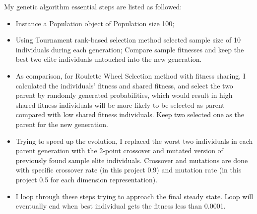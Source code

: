 \documentclass[10pt,b5paper]{article}
\begin{document}
My genetic algorithm essential steps are listed as followed:
\begin{itemize}
\item Instance a Population object of Population size 100;
\item Using Tournament rank-based selection method selected sample size of 10 individuals during each generation; Compare sample fitnesses and keep the best two elite individuals untouched into the new generation.
\item As comparison, for Roulette Wheel Selection method with fitness sharing, I calculated the individuals' fitness and shared fitness, and select the two parent by randomly generated probabilities, which would result in high shared fitness individuals will be more likely to be selected as parent compared with low shared fitness individuals. Keep two selected one as the parent for the new generation.
\item Trying to speed up the evolution, I replaced the worst two individuals in each parent generation with the 2-point crossover and mutated version of previously found sample elite individuals. Crossover and mutations are done with specific crossover rate (in this project 0.9) and mutation rate (in this project 0.5 for each dimension representation).
\item I loop through these steps trying to approach the final steady state. Loop will eventually end when best individual gets the fitness less than 0.0001.
\end{itemize}
\end{document}

